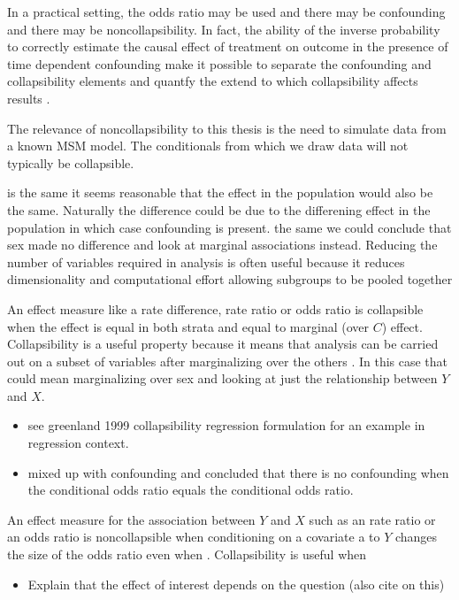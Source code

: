 \documentclass[11pt]{article}
\providecommand{\tightlist}{%
      \setlength{\itemsep}{0pt}\setlength{\parskip}{0pt}}
\begin{document}
In a practical setting, the odds ratio may be used and there may be
confounding and there may be noncollapsibility. In fact, the ability of
the inverse probability to correctly estimate the causal effect of
treatment on outcome in the presence of time dependent confounding make
it possible to separate the confounding and collapsibility elements and
quantfy the extend to which collapsibility affects results
\citet{Pang2016}. \linebreak

The relevance of noncollapsibility to this thesis is the need to
simulate data from a known MSM model. The conditionals from which we
draw data will not typically be collapsible.

is the same it seems reasonable that the effect in the population would
also be the same. Naturally the difference could be due to the
differening effect in the population in which case confounding is
present. the same we could conclude that sex made no difference and look
at marginal associations instead. Reducing the number of variables
required in analysis is often useful because it reduces dimensionality
and computational effort allowing subgroups to be pooled together

An effect measure like a rate difference, rate ratio or odds ratio is
collapsible when the effect is equal in both strata and equal to
marginal (over \(C\)) effect. Collapsibility is a useful property
because it means that analysis can be carried out on a subset of
variables after marginalizing over the others . In this case that could
mean marginalizing over sex and looking at just the relationship between
\(Y\) and \(X\). \linebreak  

\begin{itemize}
\tightlist
\item
  see greenland 1999 collapsibility regression formulation for an
  example in regression context.
\item
  mixed up with confounding and concluded that there is no confounding
  when the conditional odds ratio equals the conditional odds ratio.
\end{itemize}

An effect measure for the association between \(Y\) and \(X\) such as an
rate ratio or an odds ratio is noncollapsible when conditioning on a
covariate a to \(Y\) changes the size of the odds ratio even when .
Collapsibility is useful when

\begin{itemize}
\tightlist
\item
  Explain that the effect of interest depends on the question (also cite
  \citet{Pearl2014} on this)
\end{itemize}
\end{document}
